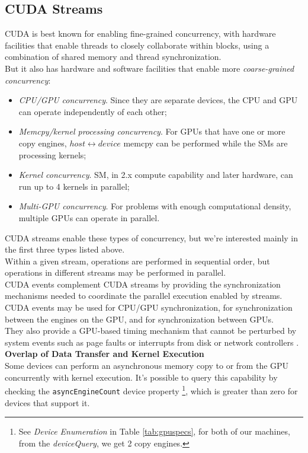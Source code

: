 \subsection{CUDA Streams}
\label{subs:streams} 
CUDA is best known for enabling fine-grained concurrency, with hardware facilities that enable threads to closely collaborate within blocks, using a combination of shared memory and thread synchronization.\\
But it also has hardware and software facilities that enable more \textit{coarse-grained concurrency}: 
\begin{itemize}
	\item \textit{CPU/GPU concurrency}. Since they are separate devices, the CPU and GPU can operate independently of each other;
	\item \textit{Memcpy/kernel processing concurrency}. For GPUs that have one or more copy engines, \(host \leftrightarrow device\) memcpy can be performed while the SMs are processing kernels;
	\item \textit{Kernel concurrency}. SM, in 2.x compute capability and later hardware, can run up to 4 kernels in parallel;
	\item \textit{Multi-GPU concurrency}. For problems with enough computational density, multiple GPUs can operate in parallel.
\end{itemize}
  CUDA streams enable these types of concurrency, but we're interested mainly in the first three types listed above.\\
  Within a given stream, operations are performed in sequential order, but operations in different streams may be performed in parallel.\\
  CUDA events complement CUDA streams by providing the synchronization mechanisms needed to coordinate the parallel execution enabled by streams. CUDA events may be used for CPU/GPU synchronization, for synchronization between the engines on the GPU, and for synchronization between GPUs.\\
  They also provide a GPU-based timing mechanism that cannot be perturbed by system events such as page faults or interrupts from disk or network controllers \cite{cudahandbook}. \\
  

	\textbf{Overlap of Data Transfer and Kernel Execution}\\
	Some devices can perform an asynchronous memory copy to or from the GPU	concurrently with kernel execution. 
	It's possible to query this capability by checking the \texttt{asyncEngineCount} device property \footnote{ See \textit{Device Enumeration} in Table \ref{tab:gpuspecs}, for both of our machines, from the \textit{deviceQuery}, we get 2 copy engines.}, which is greater than zero for devices that support it.


